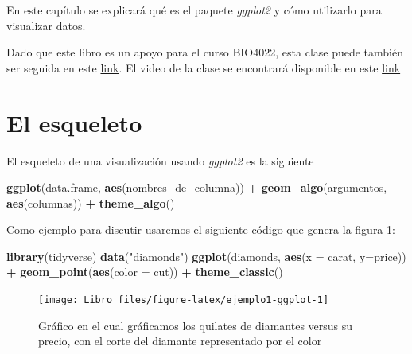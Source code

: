 \documentclass[]{book}
\newenvironment{Shaded}{\begin{snugshade}}{\end{snugshade}}
\newcommand{\DataTypeTok}[1]{\textcolor[rgb]{0.13,0.29,0.53}{#1}}
\newcommand{\KeywordTok}[1]{\textcolor[rgb]{0.13,0.29,0.53}{\textbf{#1}}}
\newcommand{\NormalTok}[1]{#1}
\newcommand{\OperatorTok}[1]{\textcolor[rgb]{0.81,0.36,0.00}{\textbf{#1}}}
\newcommand{\StringTok}[1]{\textcolor[rgb]{0.31,0.60,0.02}{#1}}
\begin{document}
En este capítulo se explicará qué es el paquete \emph{ggplot2}
\citep{Wickhamggplot} y cómo utilizarlo para visualizar datos.

Dado que este libro es un apoyo para el curso BIO4022, esta clase puede
también ser seguida en este
\href{https://derek-corcoran-barrios.github.io/Clase4/Clase4Visualizacion}{link}.
El video de la clase se encontrará disponible en este
\href{https://youtu.be/YKEiqSDz-c8}{link}

\hypertarget{el-esqueleto}{%
\section{El esqueleto}\label{el-esqueleto}}

El esqueleto de una visualización usando \emph{ggplot2} es la siguiente

\begin{Shaded}
\begin{Highlighting}[]
\KeywordTok{ggplot}\NormalTok{(data.frame, }\KeywordTok{aes}\NormalTok{(nombres_de_columna)) }\OperatorTok{+}\StringTok{ }\KeywordTok{geom_algo}\NormalTok{(argumentos, }
    \KeywordTok{aes}\NormalTok{(columnas)) }\OperatorTok{+}\StringTok{ }\KeywordTok{theme_algo}\NormalTok{()}
\end{Highlighting}
\end{Shaded}

Como ejemplo para discutir usaremos el siguiente código que genera la
figura \ref{fig:ejemplo1-ggplot}:

\begin{Shaded}
\begin{Highlighting}[]
\KeywordTok{library}\NormalTok{(tidyverse)}
\KeywordTok{data}\NormalTok{(}\StringTok{"diamonds"}\NormalTok{)}
\KeywordTok{ggplot}\NormalTok{(diamonds, }\KeywordTok{aes}\NormalTok{(}\DataTypeTok{x =}\NormalTok{ carat, }\DataTypeTok{y=}\NormalTok{price)) }\OperatorTok{+}\StringTok{ }\KeywordTok{geom_point}\NormalTok{(}\KeywordTok{aes}\NormalTok{(}\DataTypeTok{color =}\NormalTok{ cut)) }\OperatorTok{+}\StringTok{ }\KeywordTok{theme_classic}\NormalTok{()}
\end{Highlighting}
\end{Shaded}

\begin{figure}

{\centering \texttt{[image: Libro\_files/figure-latex/ejemplo1-ggplot-1]} 

}

\caption{Gráfico en el cual gráficamos los quilates de diamantes versus su precio, con el corte del diamante representado por el color}\label{fig:ejemplo1-ggplot}
\end{figure}
\end{document}
